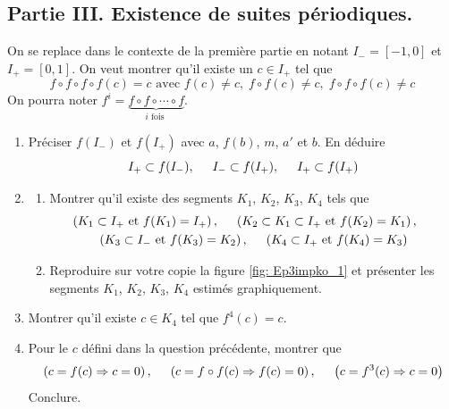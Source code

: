 \subsection*{Partie III. Existence de suites périodiques.}
On se replace dans le contexte de la première partie en notant $I_-=\left[ -1,0\right]$ et $I_+=\left[ 0 , 1\right]$.\newline
On veut montrer qu'il existe un $c\in I_+$ tel que 
\begin{displaymath}
  f\circ f \circ f \circ f(c) = c \text{ avec } f(c)\neq c, \; f\circ f (c) \neq c,\; f\circ f \circ f (c) \neq c 
\end{displaymath}
On pourra noter $f^i = \underset{i \text{ fois }}{\underbrace{f\circ f \circ \cdots \circ f}}$.
\begin{enumerate}
  \item Préciser $f(I_-)$ et $f(I_+)$ avec $a$, $f(b)$, $m$, $a'$ et $b$. En déduire
\begin{displaymath}
  I_+ \subset f(I_-),\hspace{0.5cm} I_- \subset f(I_+),\hspace{0.5cm} I_+ \subset f(I_+)
\end{displaymath}
  \item 
\begin{enumerate}
  \item Montrer qu'il existe des segments $K_1$, $K_2$, $K_3$, $K_4$ tels que 
\begin{multline*}
  \left( K_1 \subset I_+ \text{ et } f(K_1)= I_+\right), \hspace{0.5cm} 
  \left( K_2 \subset K_1 \subset I_+ \text{ et } f(K_2)= K_1\right), \hspace{0.5cm}\\
  \left( K_3 \subset I_- \text{ et } f(K_3)= K_2\right), \hspace{0.5cm}
  \left( K_4 \subset I_+ \text{ et } f(K_4)= K_3\right)
\end{multline*}
  \item Reproduire sur votre copie la figure \ref{fig: Ep3impko_1} et présenter les segments $K_1$, $K_2$, $K_3$, $K_4$ estimés graphiquement.
\end{enumerate}

  \item Montrer qu'il existe $c\in K_4$ tel que $f^4(c) = c$.
  
  \item Pour le $c$ défini dans la question précédente, montrer que
\begin{displaymath}
\left( c=f(c) \Rightarrow c=0\right),\hspace{0.5cm} \left( c =f\circ f(c) \Rightarrow f(c)=0\right),\hspace{0.5cm}
\left( c=f^3(c) \Rightarrow c=0\right)
\end{displaymath}
Conclure.


\end{enumerate}
